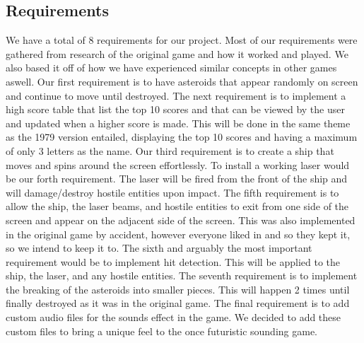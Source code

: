 \documentclass[10pt,conference,onecolumn,compsoc]{IEEEtran}
\begin{document}
\subsection{Requirements}
We have a total of 8 requirements for our project. Most of our requirements were gathered from research of the original game and how it worked and played. We also based it off of how we have experienced similar concepts in other games aswell. Our first requirement is to have asteroids that appear randomly on screen and continue to move until destroyed. The next requirement is to implement a high score table that list the top 10 scores and that can be viewed by the user and updated when a higher score is made. This will be done in the same theme as the 1979 version entailed, displaying the top 10 scores and having a maximum of only 3 letters as the name. Our third requirement is to create a ship that moves and spins around the screen effortlessly. To install a working laser would be our forth requirement. The laser will be fired from the front of the ship and will damage/destroy hostile entities upon impact. The fifth requirement is to allow the ship, the laser beams, and hostile entities to exit from one side of the screen and appear on the adjacent side of the screen. This was also implemented in the original game by accident, however everyone liked in and so they kept it, so we intend to keep it to. The sixth and arguably the most important requirement would be to implement hit detection. This will be applied to the ship, the laser, and any hostile entities. The seventh requirement is to implement the breaking of the asteroids into smaller pieces. This will happen 2 times until finally destroyed as it was in the original game. The final requirement is to add custom audio files for the sounds effect in the game. We decided to add these custom files to bring a unique feel to the once futuristic sounding game.
\end{document}
